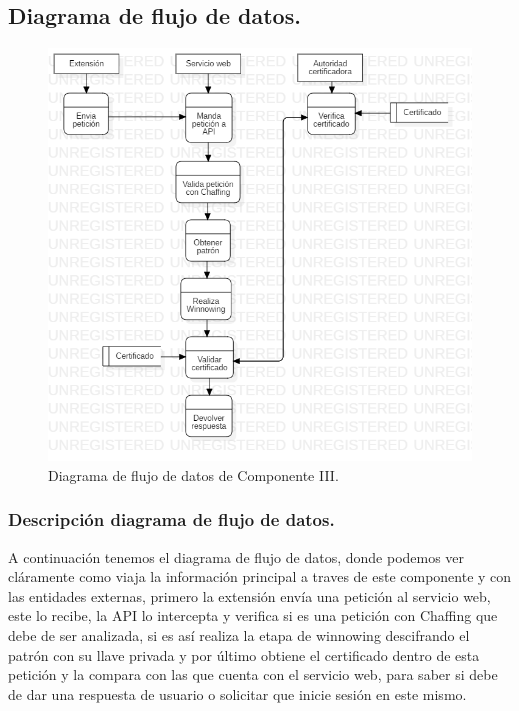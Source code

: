 \documentclass[12pt, a4paper, titlepage]{report}
\begin{document}
            \subsection{Diagrama de flujo de datos.}
        
                \begin{figure}[H]
                	\begin{center}	\includegraphics[width=12cm]{./imagenes/Disenio/Componente_3/CIII_DFD.png}
                	\caption{Diagrama de flujo de datos de Componente III.}
                	\end{center}
        		\end{figure}
        
                \subsubsection{Descripción diagrama de flujo de datos.}
            
                A continuación tenemos el diagrama de flujo de datos, donde podemos ver cláramente como viaja la información principal a traves de este componente y con las entidades externas, primero la extensión envía una petición al servicio web, este lo recibe, la API lo intercepta y verifica si es una petición con Chaffing que debe de ser analizada, si es así realiza la etapa de winnowing descifrando el patrón con su llave privada y por último obtiene el certificado dentro de esta petición y la compara con las que cuenta con el servicio web, para saber si debe de dar una respuesta de usuario o solicitar que inicie sesión en este mismo.
        
\end{document}
